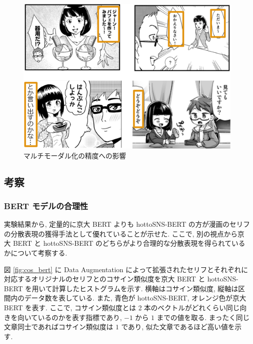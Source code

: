 \begin{figure}[!h]
  \centering
  \includegraphics[width=0.75\hsize]{doc/figures/multimodal_add_seikai.png}
  \caption{マルチモーダル化の精度への影響}
  \label{fig:multimodal_add_seikai}
\end{figure}

\newpage
\changeindent{0cm}
\subsection{考察}
\changeindent{2cm}

\changeindent{0cm}
\subsubsection{BERT モデルの合理性}
\changeindent{2cm}

実験結果から, 定量的に京大 BERT よりも hottoSNS-BERT の方が漫画のセリフの分散表現の獲得手法として優れていることが示せた. ここで, 別の視点から京大 BERT と hottoSNS-BERT のどちらがより合理的な分散表現を得られているかについて考察する.

図 \ref{fig:cos_bert} に Data Augmentation によって拡張されたセリフとそれぞれに対応するオリジナルのセリフとのコサイン類似度を京大 BERT と hottoSNS-BERT を用いて計算したヒストグラムを示す. 横軸はコサイン類似度, 縦軸は区間内のデータ数を表している. また, 青色が hottoSNS-BERT, オレンジ色が京大 BERT を表す. ここで, コサイン類似度とは 2 本のベクトルがどれくらい同じ向きを向いているのかを表す指標であり, $-1$ から $1$ までの値を取る. まったく同じ文章同士であればコサイン類似度は $1$ であり, 似た文章であるほど高い値を示す.

